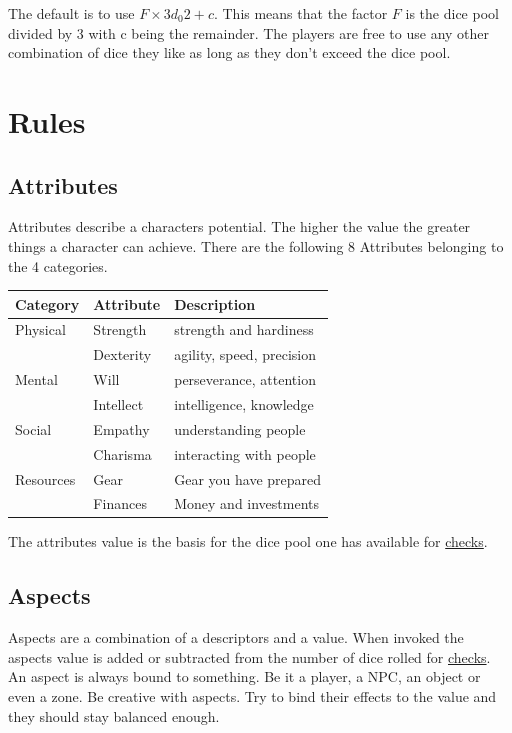 \documentclass[11pt]{article}
\begin{document}
{The default is to use \(F \times 3 d_0 2 + c\). This means that the factor \(F\) is the dice pool divided by 3 with c being the remainder. The players are free to use any other combination of dice they like as long as they don't exceed the dice pool.

\newpage
\section{Rules}
\label{sec:orgdee138c}

\subsection{Attributes}
\label{sec:org971eef4}
Attributes describe a characters potential. The higher the value the greater things a character can achieve. There are the following 8 Attributes belonging to the 4 categories.

\begin{center}
\begin{tabular}{lll}
\textbf{Category} & \textbf{Attribute} & \textbf{Description}\\[0pt]
\hline
Physical & Strength & strength and hardiness\\[0pt]
 & Dexterity & agility, speed, precision\\[0pt]
\hline
Mental & Will & perseverance, attention\\[0pt]
 & Intellect & intelligence, knowledge\\[0pt]
\hline
Social & Empathy & understanding people\\[0pt]
 & Charisma & interacting with people\\[0pt]
\hline
Resources & Gear & Gear you have prepared\\[0pt]
 & Finances & Money and investments\\[0pt]
\end{tabular}
\end{center}

The attributes value is the basis for the dice pool one has available for \hyperref[sec:orgdb9101c]{checks}. 

\subsection{Aspects}
\label{sec:org0141223}
Aspects are a combination of a descriptors and a value. When invoked the aspects value is added or subtracted from the number of dice rolled for \hyperref[sec:orgdb9101c]{checks}. An aspect is always bound to something. Be it a player, a NPC, an object or even a zone. Be creative with aspects. Try to bind their effects to the value and they should stay balanced enough.

}
\end{document}
